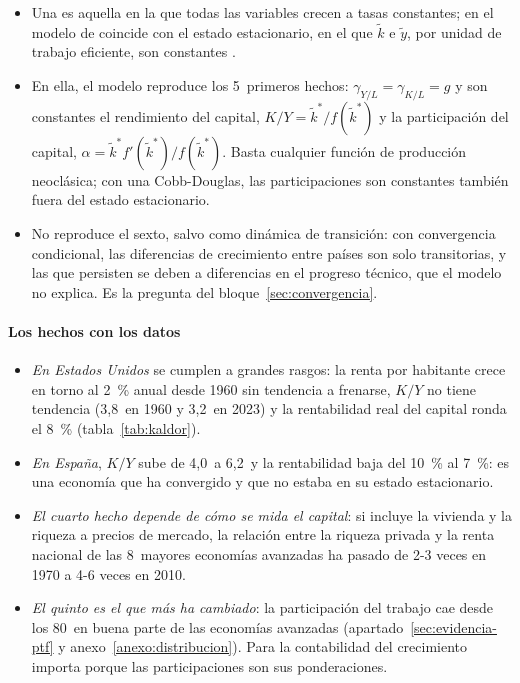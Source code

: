 \documentclass[11pt]{article}
\begin{document}
\begin{itemize}
\item Una  es aquella en la que todas las variables crecen a tasas constantes; en el modelo de  coincide con el estado estacionario, en el que $\tilde k$ e $\tilde y$, por unidad de trabajo eficiente, son constantes .
\item En ella, el modelo reproduce los 5~primeros hechos: $\gamma_{Y/L}=\gamma_{K/L}=g$ y son constantes el rendimiento del capital, $K/Y=\tilde k^*/f(\tilde k^*)$ y la participación del capital, $\alpha=\tilde k^*f'(\tilde k^*)/f(\tilde k^*)$. Basta cualquier función de producción neoclásica; con una Cobb-Douglas, las participaciones son constantes también fuera del estado estacionario.
\item No reproduce el sexto, salvo como dinámica de transición: con convergencia condicional, las diferencias de crecimiento entre países son solo transitorias, y las que persisten se deben a diferencias en el progreso técnico, que el modelo no explica. Es la pregunta del bloque~\ref{sec:convergencia}.
\end{itemize}

\paragraph{Los hechos con los datos}

\begin{itemize}
\item \emph{En Estados Unidos} se cumplen a grandes rasgos: la renta por habitante crece en torno al 2~\% anual desde 1960 sin tendencia a frenarse, $K/Y$ no tiene tendencia (3,8~en 1960 y 3,2~en 2023) y la rentabilidad real del capital ronda el 8~\%\nocite{GGDC2025PWT} (tabla~\ref{tab:kaldor}).
\item \emph{En España}, $K/Y$ sube de 4,0~a 6,2~y la rentabilidad baja del 10~\% al 7~\%: es una economía que ha convergido y que no estaba en su estado estacionario.
\item \emph{El cuarto hecho depende de cómo se mida el capital}: si incluye la vivienda y la riqueza a precios de mercado, la relación entre la riqueza privada y la renta nacional de las 8~mayores economías avanzadas ha pasado de 2-3 veces en 1970 a 4-6 veces en 2010\nocite{PikettyZucman2014Capital}.
\item \emph{El quinto es el que más ha cambiado}: la participación del trabajo cae desde los 80~en buena parte de las economías avanzadas (apartado~\ref{sec:evidencia-ptf} y anexo~\ref{anexo:distribucion}). Para la contabilidad del crecimiento importa porque las participaciones son sus ponderaciones.
\end{itemize}
\end{document}
